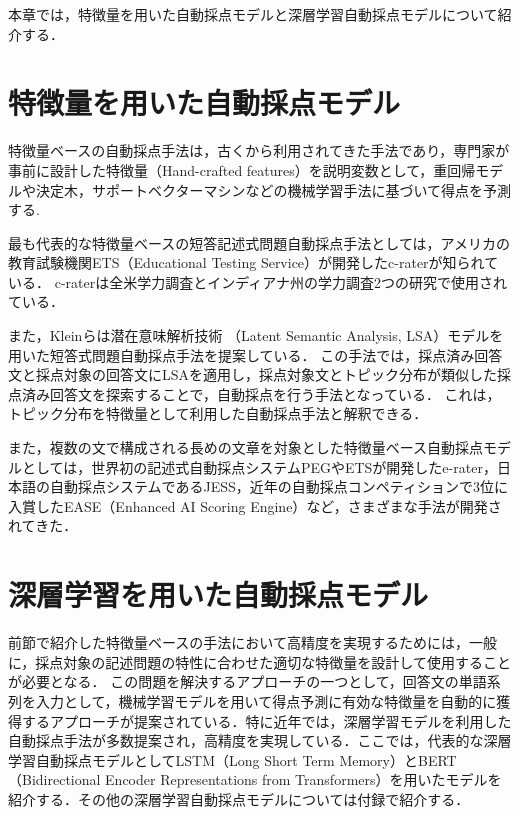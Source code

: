 \documentclass[a4paper,12pt,oneside,openany]{jsbook}
\begin{document}
本章では，特徴量を用いた自動採点モデルと深層学習自動採点モデルについて紹介する．

\section{特徴量を用いた自動採点モデル}

特徴量ベースの自動採点手法は，古くから利用されてきた手法であり，専門家が事前に設計した特徴量（Hand-crafted features）を説明変数として，重回帰モデルや決定木，サポートベクターマシンなどの機械学習手法に基づいて得点を予測する.

最も代表的な特徴量ベースの短答記述式問題自動採点手法としては，アメリカの教育試験機関ETS（Educational Testing Service）が開発したc-raterが知られている\cite{fearture9}．
c-raterは全米学力調査とインディアナ州の学力調査2つの研究で使用されている．

また，Kleinら\cite{fearture10}は潜在意味解析技術 （Latent Semantic Analysis, LSA）モデルを用いた短答式問題自動採点手法を提案している．
この手法では，採点済み回答文と採点対象の回答文にLSAを適用し，採点対象文とトピック分布が類似した採点済み回答文を探索することで，自動採点を行う手法となっている．
これは，トピック分布を特徴量として利用した自動採点手法と解釈できる．

また，複数の文で構成される長めの文章を対象とした特徴量ベース自動採点モデルとしては，世界初の記述式自動採点システムPEG\cite{fearture3}やETSが開発したe-rater\cite{fearture7}，日本語の自動採点システムであるJESS\cite{fearture8}，近年の自動採点コンペティションで3位に入賞したEASE（Enhanced AI Scoring Engine）\cite{EASE}など，さまざまな手法が開発されてきた\cite{fearture1,fearture4,fearture5,fearture6}．


\section{深層学習を用いた自動採点モデル}\label{sec:lstm}

前節で紹介した特徴量ベースの手法において高精度を実現するためには，一般に，採点対象の記述問題の特性に合わせた適切な特徴量を設計して使用することが必要となる．
この問題を解決するアプローチの一つとして，回答文の単語系列を入力として，機械学習モデルを用いて得点予測に有効な特徴量を自動的に獲得するアプローチが提案されている．特に近年では，深層学習モデルを利用した自動採点手法が多数提案され，高精度を実現している\cite{lstm1,lstm2,lstm3,lstm4,lstm5,lstm6}．ここでは，代表的な深層学習自動採点モデルとしてLSTM（Long Short Term Memory）とBERT（Bidirectional Encoder Representations from Transformers）を用いたモデルを紹介する．その他の深層学習自動採点モデルについては付録で紹介する．
\end{document}

